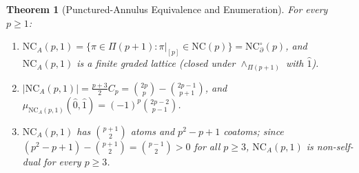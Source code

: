 \documentclass[11pt]{article}
\newtheorem{theorem}{Theorem}[section]
\theoremstyle{definition}
\newcommand{\NC}{\mathrm{NC}}
\newcommand{\NCA}{\mathrm{NC}_A}
\begin{document}
\begin{theorem}[Punctured-Annulus Equivalence and Enumeration]\label{thm:nca-p1}
For every $p \ge 1$:
\begin{enumerate}
  \item $\NCA(p, 1) = \{\pi \in \Pi(p+1) : \pi|_{[p]} \in \NC(p)\} = \NC_\partial^\circ(p)$, and $\NCA(p, 1)$ is a finite graded lattice (closed under $\wedge_{\Pi(p+1)}$ with $\hat{1}$).
  \item $|\NCA(p, 1)| = \frac{p+3}{2} C_p = \binom{2p}{p} - \binom{2p-1}{p+1}$, and $\mu_{\NCA(p,1)}(\hat{0}, \hat{1}) = (-1)^p \binom{2p-2}{p-1}$.
  \item $\NCA(p, 1)$ has $\binom{p+1}{2}$ atoms and $p^2 - p + 1$ coatoms; since $(p^2 - p + 1) - \binom{p+1}{2} = \binom{p-1}{2} > 0$ for all $p \ge 3$, $\NCA(p, 1)$ is non-self-dual for every $p \ge 3$.
\end{enumerate}
\end{theorem}
\end{document}
